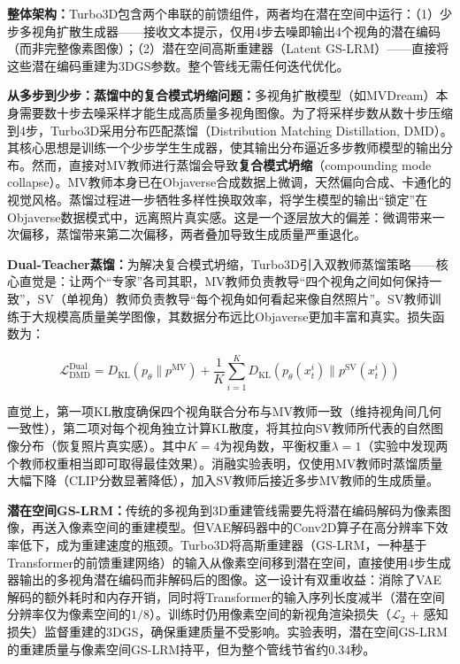 \textbf{整体架构：}Turbo3D包含两个串联的前馈组件，两者均在潜在空间中运行：（1）少步多视角扩散生成器——接收文本提示，仅用4步去噪即输出4个视角的潜在编码（而非完整像素图像）；（2）潜在空间高斯重建器（Latent GS-LRM）——直接将这些潜在编码重建为3DGS参数。整个管线无需任何迭代优化。

\textbf{从多步到少步：蒸馏中的复合模式坍缩问题：}多视角扩散模型（如MVDream）本身需要数十步去噪采样才能生成高质量多视角图像。为了将采样步数从数十步压缩到4步，Turbo3D采用分布匹配蒸馏（Distribution Matching Distillation, DMD）。其核心思想是训练一个少步学生生成器，使其输出分布逼近多步教师模型的输出分布。然而，直接对MV教师进行蒸馏会导致\textbf{复合模式坍缩}（compounding mode collapse）。MV教师本身已在Objaverse合成数据上微调，天然偏向合成、卡通化的视觉风格。蒸馏过程进一步牺牲多样性换取效率，将学生模型的输出``锁定''在Objaverse数据模式中，远离照片真实感。这是一个逐层放大的偏差：微调带来一次偏移，蒸馏带来第二次偏移，两者叠加导致生成质量严重退化。

\textbf{Dual-Teacher蒸馏：}为解决复合模式坍缩，Turbo3D引入双教师蒸馏策略——核心直觉是：让两个``专家''各司其职，MV教师负责教导``四个视角之间如何保持一致''，SV（单视角）教师负责教导``每个视角如何看起来像自然照片''。SV教师训练于大规模高质量美学图像，其数据分布远比Objaverse更加丰富和真实。损失函数为：

\begin{equation}
\mathcal{L}_{\text{DMD}}^{\text{Dual}} = D_{\text{KL}}(p_\theta \| p^{\text{MV}}) + \frac{1}{K}\sum_{i=1}^{K} D_{\text{KL}}(p_\theta(x_t^i) \| p^{\text{SV}}(x_t^i))
\end{equation}

直觉上，第一项KL散度确保四个视角联合分布与MV教师一致（维持视角间几何一致性），第二项对每个视角独立计算KL散度，将其拉向SV教师所代表的自然图像分布（恢复照片真实感）。其中$K=4$为视角数，平衡权重$\lambda=1$（实验中发现两个教师权重相当即可取得最佳效果）。消融实验表明，仅使用MV教师时蒸馏质量大幅下降（CLIP分数显著降低），加入SV教师后接近多步MV教师的生成质量。

\textbf{潜在空间GS-LRM：}传统的多视角到3D重建管线需要先将潜在编码解码为像素图像，再送入像素空间的重建模型。但VAE解码器中的Conv2D算子在高分辨率下效率低下，成为重建速度的瓶颈。Turbo3D将高斯重建器（GS-LRM，一种基于Transformer的前馈重建网络）的输入从像素空间移到潜在空间，直接使用4步生成器输出的多视角潜在编码而非解码后的图像。这一设计有双重收益：消除了VAE解码的额外耗时和内存开销，同时将Transformer的输入序列长度减半（潜在空间分辨率仅为像素空间的$1/8$）。训练时仍用像素空间的新视角渲染损失（$\mathcal{L}_2$ + 感知损失）监督重建的3DGS，确保重建质量不受影响。实验表明，潜在空间GS-LRM的重建质量与像素空间GS-LRM持平，但为整个管线节省约0.34秒。

